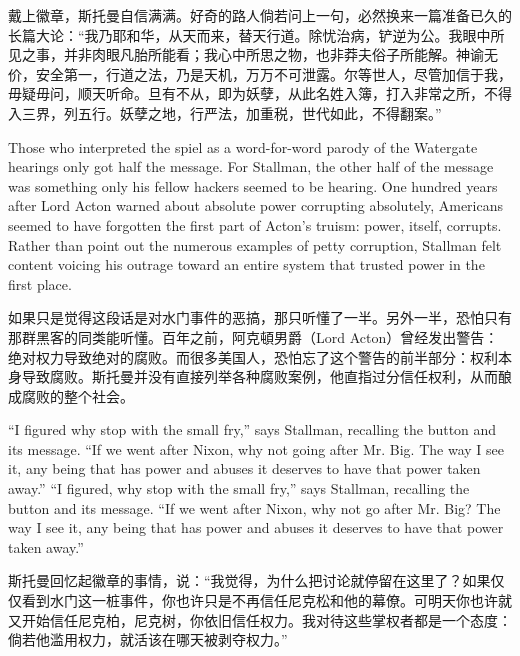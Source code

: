 \ifdefined\chs
戴上徽章，斯托曼自信满满。好奇的路人倘若问上一句，必然换来一篇准备已久的长篇大论：``我乃耶和华，从天而来，替天行道。除忧治病，铲逆为公。我眼中所见之事，并非肉眼凡胎所能看；我心中所思之物，也非莽夫俗子所能解。神谕无价，安全第一，行道之法，乃是天机，万万不可泄露。尔等世人，尽管加信于我，毋疑毋问，顺天听命。旦有不从，即为妖孽，从此名姓入簿，打入非常之所，不得入三界，列五行。妖孽之地，行严法，加重税，世代如此，不得翻案。''
\fi

\ifdefined\eng
Those who interpreted the spiel as a \ifdefined\vone word-for-word \fi parody of the Watergate hearings only got half the message. For Stallman, the other half of the message was something only his fellow hackers seemed to be hearing. One hundred years after Lord Acton warned about absolute power corrupting absolutely, Americans seemed to have forgotten the first part of Acton's truism: power, itself, corrupts. Rather than point out the numerous examples of petty corruption, Stallman felt content voicing his outrage toward an entire system that trusted power in the first place.
\fi

\ifdefined\chs
如果只是觉得这段话是对水门事件的恶搞，那只听懂了一半。另外一半，恐怕只有那群黑客的同类能听懂。百年之前，阿克頓男爵（Lord Acton）曾经发出警告：绝对权力导致绝对的腐败。而很多美国人，恐怕忘了这个警告的前半部分：权利本身导致腐败。斯托曼并没有直接列举各种腐败案例，他直指过分信任权利，从而酿成腐败的整个社会。
\fi

\ifdefined\eng
\ifdefined\vone
``I figured why stop with the small fry,'' says Stallman, recalling the button and its message. ``If we went after Nixon, why not going after Mr. Big. The way I see it, any being that has power and abuses it deserves to have that power taken away.''
\fi
\ifdefined\vtwo
``I figured, why stop with the small fry,'' says Stallman, recalling the button and its message. ``If we went after Nixon, why not go after Mr. Big? The way I see it, any being that has power and abuses it deserves to have that power taken away.''
\fi
\fi

\ifdefined\chs
斯托曼回忆起徽章的事情，说：``我觉得，为什么把讨论就停留在这里了？如果仅仅看到水门这一桩事件，你也许只是不再信任尼克松和他的幕僚。可明天你也许就又开始信任尼克柏，尼克树，你依旧信任权力。我对待这些掌权者都是一个态度：倘若他滥用权力，就活该在哪天被剥夺权力。''
\fi

\theendnotes
\setcounter{endnote}{0}
